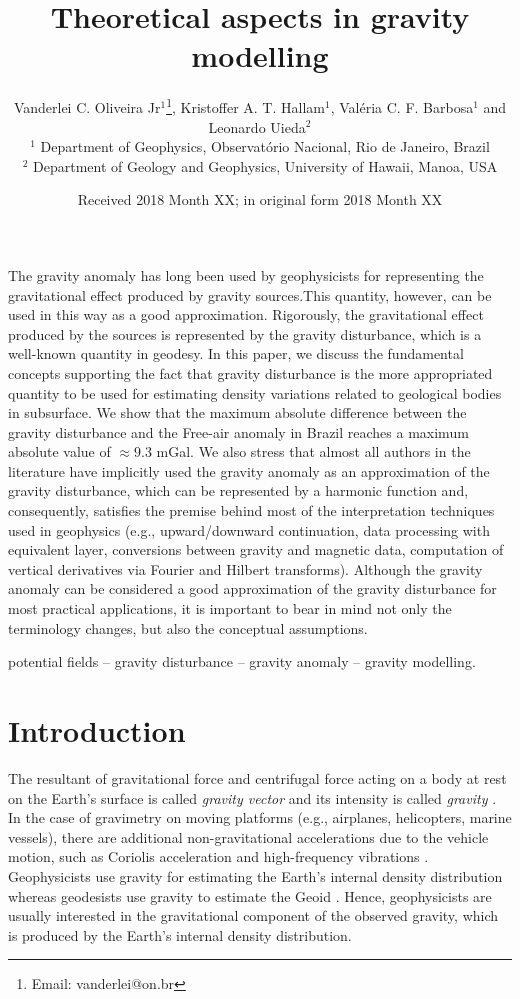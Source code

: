 \documentclass[extra]{gji}
\title[Theoretical aspects in gravity modelling]
      {Theoretical aspects in gravity modelling}
\author[Oliveira Jr et al.]
{Vanderlei C. Oliveira Jr$^1$\thanks{Email: vanderlei@on.br}, 
Kristoffer A. T. Hallam$^{1}$, Val\'{e}ria C. F. Barbosa$^1$
and Leonardo Uieda$^2$ \\
$^1$ Department of Geophysics, Observat\'{o}rio Nacional, Rio de Janeiro, Brazil \\
$^2$ Department of Geology and Geophysics, University of Hawaii, Manoa, USA
}
\date{Received 2018 Month XX; in original form 2018 Month XX}
\begin{document}
\label{firstpage}

\maketitle


\begin{summary}
 The gravity anomaly has long been used by geophysicists for 
 representing the gravitational effect produced by gravity
 sources.This quantity, however, can be used in this way as a good
 approximation. Rigorously, the gravitational effect produced by the sources
 is represented by the gravity disturbance, which is a well-known 
 quantity in geodesy.
 In this paper, we discuss the fundamental concepts supporting 
 the fact that gravity disturbance is the more appropriated quantity
 to be used for estimating density variations related to geological
 bodies in subsurface. We show that the maximum absolute difference 
 between the gravity disturbance and the Free-air anomaly in Brazil 
 reaches a maximum absolute value of $\approx 9.3$ mGal. We also stress 
 that almost all authors in the literature have implicitly used the 
 gravity anomaly as an approximation of the gravity disturbance, 
 which can be represented by a harmonic function and, consequently, 
 satisfies the premise behind most of 
 the interpretation techniques used in geophysics (e.g., 
 upward/downward continuation, data processing with equivalent layer,
 conversions between gravity and magnetic data, computation of vertical 
 derivatives via Fourier and Hilbert transforms).
 Although the gravity anomaly can be considered a good approximation of the 
 gravity disturbance for most practical applications, 
 it is important to bear in mind not only the terminology 
 changes, but also the conceptual assumptions.

\end{summary}

\begin{keywords}
 potential fields -- gravity disturbance -- gravity anomaly -- gravity modelling.
\end{keywords}


\section{Introduction}

The resultant of gravitational force and centrifugal force acting 
on a body at rest on the Earth's surface is called 
\textit{gravity vector} and its intensity is called 
\textit{gravity} \citep{heiskanen-moritz1967,
hofmann-wellenhof-moritz2005}.
In the case of gravimetry on moving platforms (e.g., airplanes,
helicopters, marine vessels), there are additional
non-gravitational accelerations due to the vehicle motion, 
such as Coriolis acceleration and high-frequency vibrations 
\citep{glennie-etal2000,nabighian-etal2005-grav,baumann-etal2012}.
Geophysicists use gravity for estimating the Earth's 
internal density distribution whereas geodesists use
gravity to estimate the Geoid \citep{li2001}.
Hence, geophysicists are usually interested 
in the gravitational component of the observed gravity, 
which is produced by the Earth's internal 
density distribution.
\end{document}
